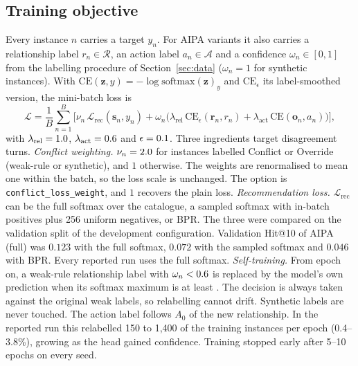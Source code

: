 \subsection{Training objective}
\label{sec:train}
Every instance $n$ carries a target $y_n$. For AIPA variants it also carries a relationship label $r_n\in\mathcal{R}$, an action label $a_n\in\mathcal{A}$ and a confidence $\omega_n\in[0,1]$ from the labelling procedure of Section~\ref{sec:data} ($\omega_n=1$ for synthetic instances). With $\mathrm{CE}(\mathbf{z},y)=-\log\mathrm{softmax}(\mathbf{z})_y$ and $\mathrm{CE}_\epsilon$ its label-smoothed version, the mini-batch loss is
{\small\begin{equation}
  \label{eq:loss}
  \mathcal{L}=\frac{1}{B}\sum_{n=1}^{B}\Big[\nu_n\,\mathcal{L}_{\mathrm{rec}}(\mathbf{s}_n,y_n)+\omega_n\big(\lambda_{\mathrm{rel}}\,\mathrm{CE}_\epsilon(\mathbf{r}_n,r_n)+\lambda_{\mathrm{act}}\,\mathrm{CE}(\mathbf{o}_n,a_n)\big)\Big],
\end{equation}}
with $\lambda_{\mathrm{rel}}=1.0$, $\lambda_{\mathrm{act}}=0.6$ and $\epsilon=0.1$. Three ingredients target disagreement turns.
\emph{Conflict weighting.} $\nu_n=2.0$ for instances labelled Conflict or Override (weak-rule or synthetic), and $1$ otherwise. The weights are renormalised to mean one within the batch, so the loss scale is unchanged. The option is \texttt{conflict\_loss\_weight}, and $1$ recovers the plain loss.
\emph{Recommendation loss.} $\mathcal{L}_{\mathrm{rec}}$ can be the full softmax over the catalogue, a sampled softmax with in-batch positives plus 256 uniform negatives, or BPR. The three were compared on the validation split of the development configuration. Validation Hit@10 of AIPA (full) was $0.123$ with the full softmax, $0.072$ with the sampled softmax and $0.046$ with BPR. Every reported run uses the full softmax.
\emph{Self-training.} From epoch \selfTrainStart{} on, a weak-rule relationship label with $\omega_n<0.6$ is replaced by the model's own prediction when its softmax maximum is at least \selfTrainThreshold. The decision is always taken against the original weak labels, so relabelling cannot drift. Synthetic labels are never touched. The action label follows $A_0$ of the new relationship. In the reported run this relabelled 150 to 1{,}400 of the \nTrain{} training instances per epoch (0.4--3.8\%), growing as the head gained confidence. Training stopped early after 5--10 epochs on every seed.

